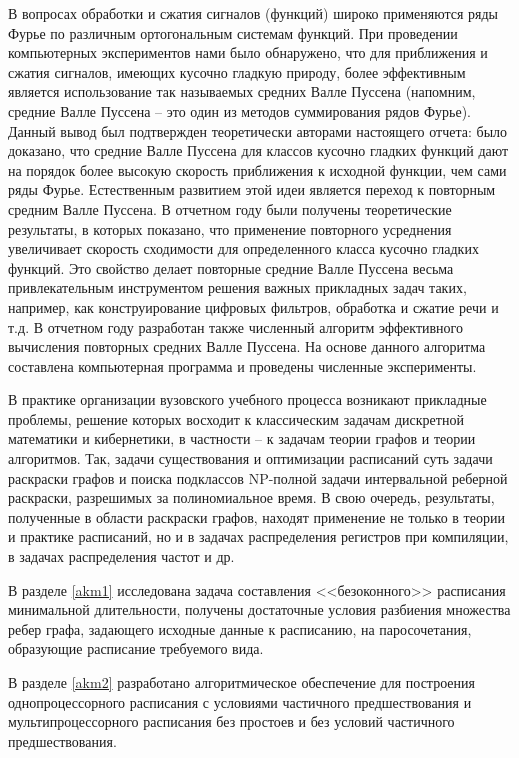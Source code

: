 В вопросах обработки и сжатия сигналов (функций) широко применяются ряды Фурье по различным ортогональным системам функций. При проведении компьютерных экспериментов нами было обнаружено, что для приближения и сжатия сигналов, имеющих кусочно гладкую природу, более эффективным является использование так называемых средних Валле Пуссена (напомним, средние Валле Пуссена -- это один из методов суммирования рядов Фурье). Данный вывод был подтвержден теоретически авторами настоящего отчета: было доказано, что средние Валле Пуссена для классов кусочно гладких функций дают на порядок более высокую скорость приближения к исходной функции, чем сами ряды Фурье. Естественным развитием этой идеи является переход к повторным средним Валле Пуссена. В отчетном году были получены теоретические результаты, в которых показано, что применение повторного усреднения увеличивает скорость сходимости для определенного класса кусочно гладких функций. Это свойство делает повторные средние Валле Пуссена весьма привлекательным инструментом решения важных прикладных задач таких, например, как конструирование цифровых фильтров, обработка и сжатие речи и т.д. В отчетном году разработан также численный алгоритм эффективного вычисления повторных средних Валле Пуссена. На основе данного алгоритма составлена компьютерная программа и проведены численные эксперименты.


В практике организации вузовского учебного процесса возникают прикладные проблемы, решение которых восходит к классическим задачам дискретной математики и кибернетики, в частности – к задачам теории графов и теории алгоритмов. Так, задачи существования и оптимизации расписаний суть задачи раскраски графов и поиска подклассов NP-полной задачи интервальной реберной раскраски, разрешимых за полиномиальное время. В свою очередь, результаты, полученные в области раскраски графов, находят применение не только в теории и практике расписаний, но и в задачах распределения регистров при компиляции, в задачах распределения частот и др.
\par\smallskip
В разделе \ref{akm1} исследована задача составления <<безоконного>> расписания минимальной длительности, получены достаточные условия разбиения множества ребер графа, задающего исходные данные к расписанию, на паросочетания, образующие расписание требуемого вида.

В разделе \ref{akm2} разработано алгоритмическое обеспечение для построения однопроцессорного расписания с условиями частичного предшествования и мультипроцессорного расписания без простоев и без условий частичного предшествования.

